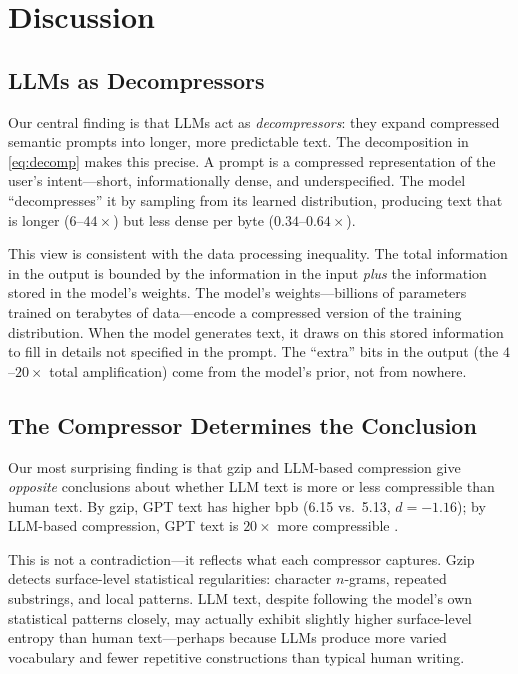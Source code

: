 \section{Discussion}
\label{sec:discussion}

\subsection{LLMs as Decompressors}
\label{sec:decompressor}

Our central finding is that LLMs act as \emph{decompressors}: they expand compressed semantic prompts into longer, more predictable text. The decomposition in \eqref{eq:decomp} makes this precise. A prompt is a compressed representation of the user's intent---short, informationally dense, and underspecified. The model ``decompresses'' it by sampling from its learned distribution, producing text that is longer ($6$--$44\times$) but less dense per byte ($0.34$--$0.64\times$).

This view is consistent with the data processing inequality. The total information in the output is bounded by the information in the input \emph{plus} the information stored in the model's weights. The model's weights---billions of parameters trained on terabytes of data---encode a compressed version of the training distribution. When the model generates text, it draws on this stored information to fill in details not specified in the prompt. The ``extra'' bits in the output (the $4$--$20\times$ total amplification) come from the model's prior, not from nowhere.

\subsection{The Compressor Determines the Conclusion}
\label{sec:compressor}

Our most surprising finding is that gzip and LLM-based compression give \emph{opposite} conclusions about whether LLM text is more or less compressible than human text. By gzip, GPT text has higher bpb (6.15 vs.\ 5.13, $d = -1.16$); by LLM-based compression, GPT text is $20\times$ more compressible \cite{wang2025lossless}.

This is not a contradiction---it reflects what each compressor captures. Gzip detects surface-level statistical regularities: character $n$-grams, repeated substrings, and local patterns. LLM text, despite following the model's own statistical patterns closely, may actually exhibit slightly higher surface-level entropy than human text---perhaps because LLMs produce more varied vocabulary and fewer repetitive constructions than typical human writing.

